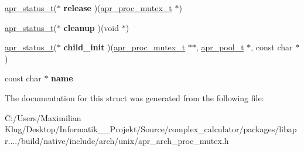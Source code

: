 \begin{DoxyCompactItemize}
\mbox{\hyperlink{group__apr__errno_gaf76ee4543247e9fb3f3546203e590a6c}{apr\+\_\+status\+\_\+t}}($\ast$ {\bfseries release} )(\mbox{\hyperlink{structapr__proc__mutex__t}{apr\+\_\+proc\+\_\+mutex\+\_\+t}} $\ast$)
\item 
\mbox{\label{structapr__proc__mutex__unix__lock__methods__t_aef52d01928a52294871cd46b7c5f4ed5}} 
\mbox{\hyperlink{group__apr__errno_gaf76ee4543247e9fb3f3546203e590a6c}{apr\+\_\+status\+\_\+t}}($\ast$ {\bfseries cleanup} )(void $\ast$)
\item 
\mbox{\label{structapr__proc__mutex__unix__lock__methods__t_ad007a049dbf527c863bd3a93d3083b60}} 
\mbox{\hyperlink{group__apr__errno_gaf76ee4543247e9fb3f3546203e590a6c}{apr\+\_\+status\+\_\+t}}($\ast$ {\bfseries child\+\_\+init} )(\mbox{\hyperlink{structapr__proc__mutex__t}{apr\+\_\+proc\+\_\+mutex\+\_\+t}} $\ast$$\ast$, \mbox{\hyperlink{group__apr__pools_gaf137f28edcf9a086cd6bc36c20d7cdfb}{apr\+\_\+pool\+\_\+t}} $\ast$, const char $\ast$)
\item 
\mbox{\label{structapr__proc__mutex__unix__lock__methods__t_a24c58211be95c42486ea7867e3ca8f2f}} 
const char $\ast$ {\bfseries name}
\end{DoxyCompactItemize}


The documentation for this struct was generated from the following file\+:\begin{DoxyCompactItemize}
\item 
C\+:/\+Users/\+Maximilian Klug/\+Desktop/\+Informatik\+\_\+\_\+\+Projekt/\+Source/complex\+\_\+calculator/packages/libapr..../build/native/include/arch/unix/apr\+\_\+arch\+\_\+proc\+\_\+mutex.\+h\end{DoxyCompactItemize}
